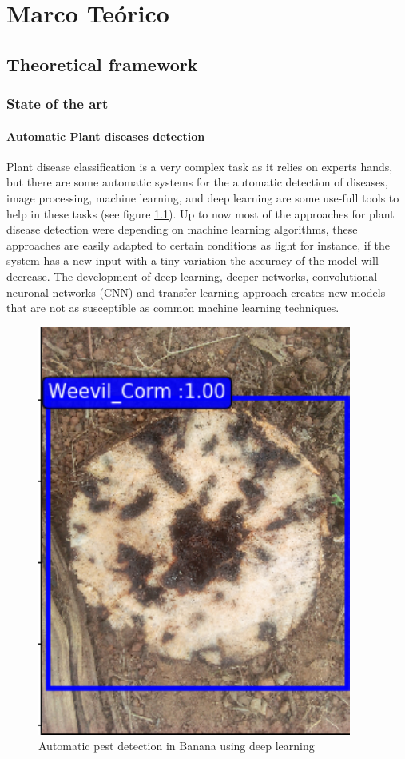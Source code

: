 \chapter{Marco Teórico} %
\label{Chapter6}

\section{Theoretical framework}

\subsection{State of the art}
\subsubsection{Automatic Plant diseases detection}

Plant disease classification is a very complex task as it relies on experts hands, but there are some automatic systems for the automatic detection of diseases, image processing, machine learning, and deep learning are some use-full tools to help in these tasks (see figure \ref{fig:detec}). Up to now most of the approaches for plant disease detection were depending on machine learning algorithms, these approaches are easily adapted to certain conditions as light for instance,  if the system has a new input with a tiny variation the accuracy of the model will decrease\cite{inbook}. The development of deep learning, deeper networks, convolutional neuronal networks (CNN) and transfer learning approach creates new models that are not as susceptible as common machine learning techniques.
\begin{figure}[h]
\centering
\includegraphics[scale=0.6]{Figures/result1.pdf}
\caption{Automatic pest detection in Banana using deep learning}
\label{fig:detec}
\end{figure}

